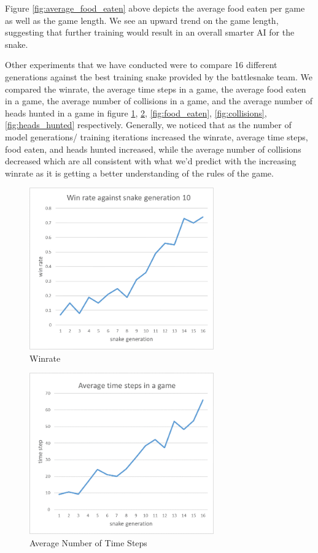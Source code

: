 \documentclass{article}
\begin{document}
\FloatBarrier

Figure \ref{fig:average_food_eaten} above depicts the average food eaten per
game as well as the game length. We see an upward trend on the game length,
suggesting that further training would result in an overall smarter AI for
the snake.

Other experiments that we have conducted were to compare 16 different
generations against the best training snake provided by the battlesnake team. We
compared the winrate, the average time steps in a game, the average food eaten
in a game, the average number of collisions in a game, and the average number of
heads hunted in a game in figure \ref{fig:winrate}, \ref{fig:time_steps},
\ref{fig:food_eaten}, \ref{fig:collisions}, \ref{fig:heads_hunted} respectively.
Generally, we noticed that as the number of model generations/ training
iterations increased the winrate, average time steps, food eaten, and heads
hunted increased, while the average number of collisions decreased which are all
consistent with what we'd predict with the increasing winrate as it is getting a
better understanding of the rules of the game.

\begin{figure}[!ht]
  \centering
  \includegraphics[width=300px]{winrate}
  \caption{Winrate}
  \label{fig:winrate}
\end{figure}
\FloatBarrier

\begin{figure}[!ht]
  \centering
  \includegraphics[width=300px]{time_steps}
  \caption{Average Number of Time Steps}
  \label{fig:time_steps}
\end{figure}
\FloatBarrier
\end{document}
